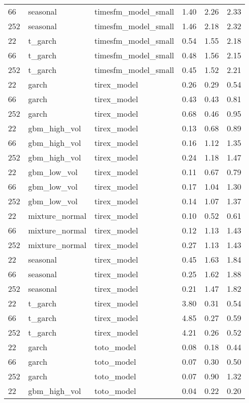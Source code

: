 {\begin{tabular}{lllrrr}
66 & seasonal & timesfm\_model\_small & 1.40 & 2.26 & 2.33 \\
252 & seasonal & timesfm\_model\_small & 1.46 & 2.18 & 2.32 \\
\midrule
22 & t\_garch & timesfm\_model\_small & 0.54 & 1.55 & 2.18 \\
66 & t\_garch & timesfm\_model\_small & 0.48 & 1.56 & 2.15 \\
252 & t\_garch & timesfm\_model\_small & 0.45 & 1.52 & 2.21 \\
\midrule
22 & garch & tirex\_model & 0.26 & 0.29 & 0.54 \\
66 & garch & tirex\_model & 0.43 & 0.43 & 0.81 \\
252 & garch & tirex\_model & 0.68 & 0.46 & 0.95 \\
\midrule
22 & gbm\_high\_vol & tirex\_model & 0.13 & 0.68 & 0.89 \\
66 & gbm\_high\_vol & tirex\_model & 0.16 & 1.12 & 1.35 \\
252 & gbm\_high\_vol & tirex\_model & 0.24 & 1.18 & 1.47 \\
\midrule
22 & gbm\_low\_vol & tirex\_model & 0.11 & 0.67 & 0.79 \\
66 & gbm\_low\_vol & tirex\_model & 0.17 & 1.04 & 1.30 \\
252 & gbm\_low\_vol & tirex\_model & 0.14 & 1.07 & 1.37 \\
\midrule
22 & mixture\_normal & tirex\_model & 0.10 & 0.52 & 0.61 \\
66 & mixture\_normal & tirex\_model & 0.12 & 1.13 & 1.43 \\
252 & mixture\_normal & tirex\_model & 0.27 & 1.13 & 1.43 \\
\midrule
22 & seasonal & tirex\_model & 0.45 & 1.63 & 1.84 \\
66 & seasonal & tirex\_model & 0.25 & 1.62 & 1.88 \\
252 & seasonal & tirex\_model & 0.21 & 1.47 & 1.82 \\
\midrule
22 & t\_garch & tirex\_model & 3.80 & 0.31 & 0.54 \\
66 & t\_garch & tirex\_model & 4.85 & 0.27 & 0.59 \\
252 & t\_garch & tirex\_model & 4.21 & 0.26 & 0.52 \\
\midrule
22 & garch & toto\_model & 0.08 & 0.18 & 0.44 \\
66 & garch & toto\_model & 0.07 & 0.30 & 0.50 \\
252 & garch & toto\_model & 0.07 & 0.90 & 1.32 \\
\midrule
22 & gbm\_high\_vol & toto\_model & 0.04 & 0.22 & 0.20 \\

\end{tabular}}

